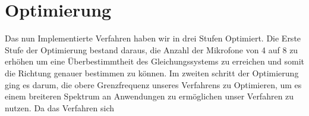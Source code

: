 \section{Optimierung} 
Das nun Implementierte Verfahren haben wir in drei Stufen Optimiert. Die Erste Stufe der Optimierung bestand daraus, die Anzahl der Mikrofone von 4 auf 8 zu erhöhen um eine Überbestimmtheit des Gleichungssystems zu erreichen und somit die Richtung genauer bestimmen zu können. 
Im zweiten schritt der Optimierung ging es darum, die obere Grenzfrequenz unseres Verfahrens zu Optimieren, um es einem breiteren Spektrum an Anwendungen zu ermöglichen unser Verfahren zu nutzen.
Da das Verfahren sich
